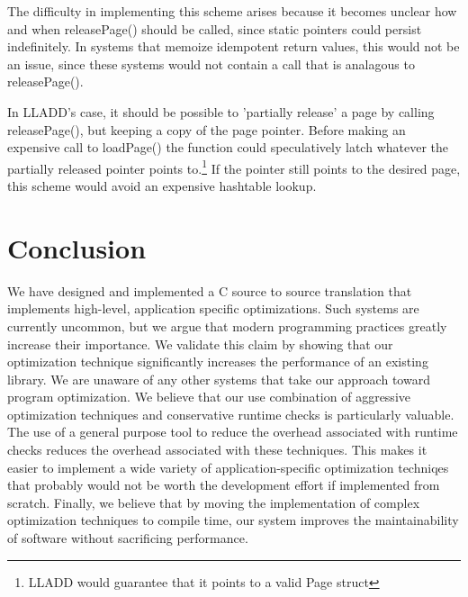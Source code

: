 \documentclass[10pt,letterpaper,twocolumn,english]{article}
\newcommand{\yad}{LLADD\xspace}
\newcommand{\pin}{loadPage()\xspace}
\newcommand{\unpin}{releasePage()\xspace}
\begin{document}
The difficulty in implementing this scheme arises because it becomes
unclear how and when \unpin should be called, since static pointers
could persist indefinitely.  In systems that
memoize idempotent return values, this would not be an issue, since
these systems would not contain a call that is analagous to \unpin.

In \yad's case, it should be possible to 'partially release' a page by
calling \unpin, but keeping a copy of the page pointer.  Before making
an expensive call to \pin the function could speculatively latch
whatever the partially released pointer points
to.\footnote{\yad would guarantee that it points to a valid Page
struct} If the pointer still points to the desired page, this
scheme would avoid an expensive hashtable lookup.

\section{Conclusion}

We have designed and implemented a C source to source translation that
implements high-level, application specific optimizations.  Such
systems are currently uncommon, but we argue that modern programming
practices greatly increase their importance.  We validate this claim
by showing that our optimization technique significantly increases the
performance of an existing library.  We are unaware of any other
systems that take our approach toward program optimization.  We
believe that our use combination of aggressive optimization techniques
and conservative runtime checks is particularly valuable.  The use of
a general purpose tool to reduce the overhead associated with runtime
checks reduces the overhead associated with these techniques.  This
makes it easier to implement a wide variety of application-specific
optimization techniqes that probably would not be worth the
development effort if implemented from scratch.  Finally, we believe
that by moving the implementation of complex optimization techniques
to compile time, our system improves the maintainability of software
without sacrificing performance.
\end{document}
